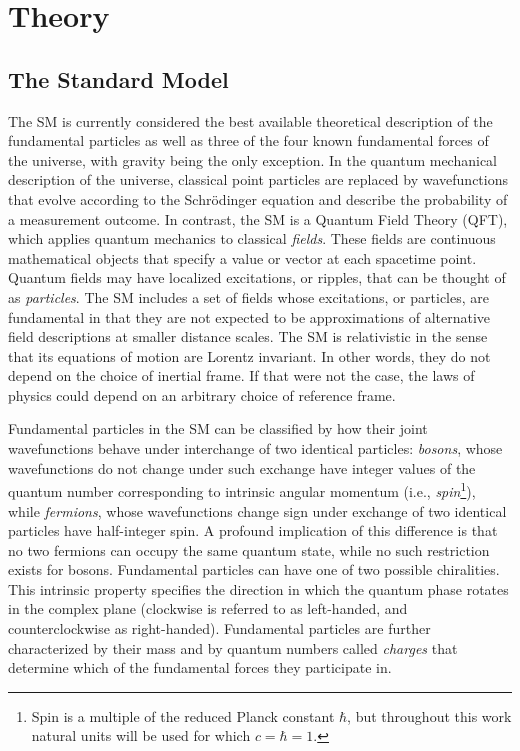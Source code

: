 \setlength{\abovedisplayshortskip}{0pt}
\chapter{Theory}
\label{chap:theory}

\section{The Standard Model}
The SM is currently considered the best available theoretical description of the
fundamental particles as well as three of the four known fundamental forces of
the universe, with gravity being the only exception. In the quantum mechanical
description of the universe, classical point particles are replaced by
wavefunctions that evolve according to the Schr\"odinger equation and describe
the probability of a measurement outcome. In contrast, the SM is a Quantum Field
Theory (QFT), which applies quantum mechanics to classical \textit{fields}.
These fields are continuous mathematical objects that specify a value or vector
at each spacetime point. Quantum fields may have localized excitations, or
ripples, that can be thought of as \textit{particles}. The SM includes a set of
fields whose excitations, or particles, are fundamental in that they are not
expected to be approximations of alternative field descriptions at smaller
distance scales. The SM is relativistic in the sense that its equations of
motion are Lorentz invariant. In other words, they do not depend on the choice
of inertial frame. If that were not the case, the laws of physics could depend
on an arbitrary choice of reference frame.

Fundamental particles in the SM can be classified by how their joint
wavefunctions behave under interchange of two identical particles:
\textit{bosons}, whose wavefunctions do not change under such exchange have
integer values of the quantum number corresponding to intrinsic angular momentum
(i.e., \textit{spin}\footnote{Spin is a multiple of the reduced Planck constant
$\hbar$, but throughout this work natural units will be used for which $c =
\hbar = 1$.}), while \textit{fermions}, whose wavefunctions change sign under
exchange of two identical particles have half-integer spin. A profound
implication of this difference is that no two fermions can occupy the same
quantum state, while no such restriction exists for bosons. Fundamental
particles can have one of two possible chiralities. This intrinsic property
specifies the direction in which the quantum phase rotates in the complex plane
(clockwise is referred to as left-handed, and counterclockwise as right-handed).
Fundamental particles are further characterized by their mass and by quantum
numbers called \textit{charges} that determine which of the fundamental forces
they participate in.

